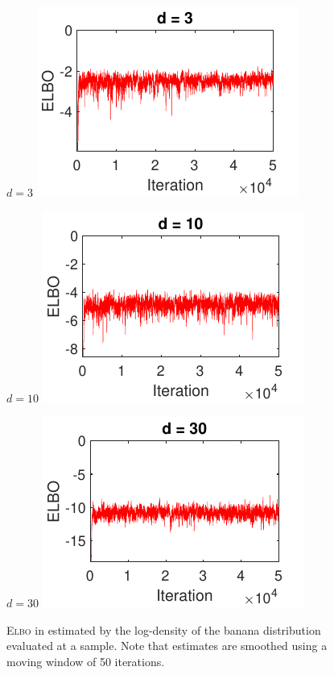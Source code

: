 \documentclass[10pt]{article}
\begin{document}
\begin{figure}[p!]
\centering
\begin{minipage}{0.32\textwidth}
\centering
$d=3$
\includegraphics[trim={0 0 0 11.5},clip]{images/bananaND_usivi_ELBO_movavg50_d3_m5.pdf}
\end{minipage}
\begin{minipage}{0.32\textwidth}
\centering
$d=10$
\includegraphics[trim={0 0 0 11.5},clip]{images/bananaND_usivi_ELBO_movavg50_d10_m5.pdf}
\end{minipage}
\begin{minipage}{0.32\textwidth}
\centering
$d=30$
\includegraphics[trim={0 0 0 11.5},clip]{images/bananaND_usivi_ELBO_movavg50_d30_m5.pdf}
\end{minipage}
\caption{\textsc{Elbo} in \uivi estimated by the log-density of the banana distribution evaluated at a sample. Note that estimates are smoothed using a moving window of 50 iterations.}
\label{fig:elbo}
\end{figure}
\end{document}
